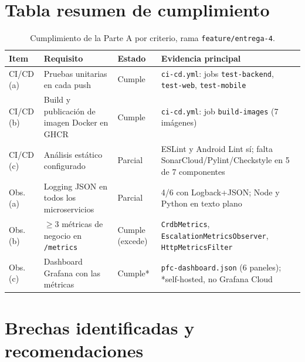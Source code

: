 \documentclass[11pt,letterpaper]{article}
\begin{document}
\section{Tabla resumen de cumplimiento}

\begin{table}[H]
\centering
\small
\begin{tabular}{P{1.3cm} P{6.7cm} P{2.3cm} P{4cm}}
\toprule
\textbf{Item} & \textbf{Requisito} & \textbf{Estado} & \textbf{Evidencia principal} \\
\midrule
CI/CD (a) & Pruebas unitarias en cada push & Cumple & \texttt{ci-cd.yml}: jobs \texttt{test-backend}, \texttt{test-web}, \texttt{test-mobile} \\
CI/CD (b) & Build y publicación de imagen Docker en GHCR & Cumple & \texttt{ci-cd.yml}: job \texttt{build-images} (7 imágenes) \\
CI/CD (c) & Análisis estático configurado & Parcial & ESLint y Android Lint sí; falta SonarCloud/Pylint/Checkstyle en 5 de 7 componentes \\
Obs. (a) & Logging JSON en todos los microservicios & Parcial & 4/6 con Logback+JSON; Node y Python en texto plano \\
Obs. (b) & $\geq$3 métricas de negocio en \texttt{/metrics} & Cumple (excede) & \texttt{CrdbMetrics}, \texttt{EscalationMetricsObserver}, \texttt{HttpMetricsFilter} \\
Obs. (c) & Dashboard Grafana con las métricas & Cumple* & \texttt{pfc-dashboard.json} (6 paneles); *self-hosted, no Grafana Cloud \\
\bottomrule
\end{tabular}
\caption{Cumplimiento de la Parte A por criterio, rama \texttt{feature/entrega-4}.}
\end{table}

\section{Brechas identificadas y recomendaciones}
\end{document}
